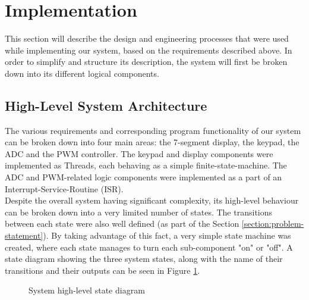 \section{Implementation}

This section will describe the design and engineering processes that were used while implementing our system, based on the requirements described above. In order to simplify and structure its description, the system will first be broken down into its different logical components.\\


\subsection{High-Level System Architecture}


The various requirements and corresponding program functionality of our system can be broken down into four main areas: the 7-segment display, the keypad, the ADC and the PWM controller. The keypad and display components were implemented as Threads, each behaving as a simple finite-state-machine. The ADC and PWM-related logic components were implemented as a part of an Interrupt-Service-Routine (ISR).\\

Despite the overall system having significant complexity, its high-level behaviour can be broken down into a very limited number of states. The transitions between each state were also well defined (as part of the Section \ref{section:problem-statement}). By taking advantage of this fact, a very simple state machine was created, where each state manages to turn each sub-component "on" or "off". A state diagram showing the three system states, along with the name of their transitions and their outputs can be seen in Figure \ref{fig:high-level-state-diagram}.


\begin{figure}[h]
\centering
{}
\caption{System high-level state diagram}
\label{fig:high-level-state-diagram}
\end{figure}




